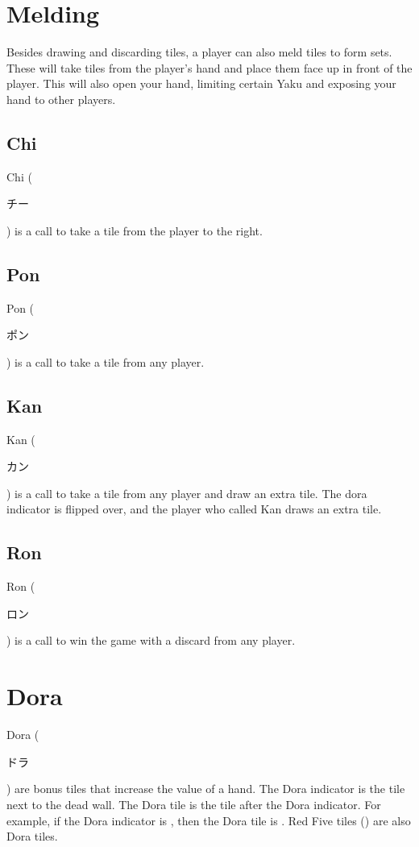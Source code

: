 \documentclass[8pt,landscape]{article}
\begin{document}
\begin{minipage}[t][.8\textheight][t]{\textwidth}
\begin{multicols*}{3}
    \section{Melding}
    Besides drawing and discarding tiles, a player can also meld tiles to form sets.
    These will take tiles from the player's hand and place them face up in front of the player.
    This will also open your hand, limiting certain Yaku and exposing your hand to other players.
    \subsection{Chi}
    Chi (\begin{CJK}{UTF8}{min}チー\end{CJK}) is a call to take a tile from the player to the right.

    \subsection{Pon}
    Pon (\begin{CJK}{UTF8}{min}ポン\end{CJK}) is a call to take a tile from any player.

    \subsection{Kan}
    Kan (\begin{CJK}{UTF8}{min}カン\end{CJK}) is a call to take a tile from any player and draw an extra tile.
    The dora indicator is flipped over, and the player who called Kan draws an extra tile.

    \subsection{Ron}
    Ron (\begin{CJK}{UTF8}{min}ロン\end{CJK}) is a call to win the game with a discard from any player.

    \section{Dora}
    Dora (\begin{CJK}{UTF8}{min}ドラ\end{CJK}) are bonus tiles that increase the value of a hand.
    The Dora indicator is the tile next to the dead wall.
    The Dora tile is the tile after the Dora indicator. For example, if the Dora indicator is , then the Dora tile is .
    Red Five tiles () are also Dora tiles.


\end{multicols*}
\end{minipage}
\end{document}
